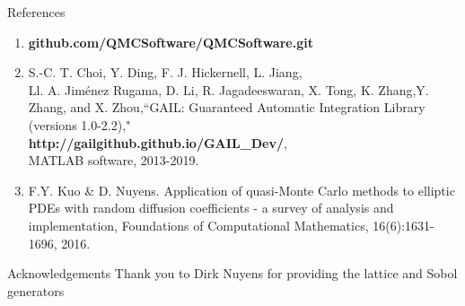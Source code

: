 \documentclass[final]{beamer}
\newlength{\onecolwid}
\begin{document}
\begin{frame}[t]
\begin{columns}[t]
\begin{column}{\onecolwid}
\begin{block}{References}
\begin{enumerate}
    \item \textbf{github.com/QMCSoftware/QMCSoftware.git}
    \item S.-C. T. Choi, Y. Ding, F. J. Hickernell, L. Jiang,\\
    Ll. A. Jim\'enez Rugama, D. Li, R. Jagadeeswaran, X. Tong, K. Zhang,Y. Zhang, and X. Zhou,``GAIL: Guaranteed Automatic Integration Library (versions 1.0-2.2),"\\
    \textbf{http://gailgithub.github.io/GAIL\_Dev/},\\
    MATLAB software, 2013-2019.
    \item F.Y. Kuo \& D. Nuyens. Application of quasi-Monte Carlo methods to elliptic PDEs with random diffusion coefficients - a survey of analysis and implementation, Foundations of Computational Mathematics, 16(6):1631-1696, 2016.
\end{enumerate}
\end{block}
\begin{block}{Acknowledgements}
    Thank you to Dirk Nuyens for providing the lattice and Sobol generators
\end{block}
\end{column}
\end{columns}
\end{frame}
\end{document}
